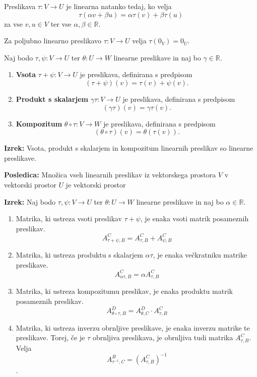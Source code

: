 \documentclass{article}
\begin{document}
\begin{multicols}{2}
Preslikava \( \tau: V \to U \) je linearna natanko tedaj, ko velja
\[ \tau(\alpha v + \beta u) = \alpha \tau(v) + \beta \tau(u) \]
za vse \( v, u \in V \) ter vse \( \alpha, \beta \in \mathbb{R} \).

Za poljubno linearno preslikavo \( \tau: V \to U \) velja \( \tau(0_V) = 0_U \).

Naj bodo \( \tau, \psi: V \to U \) ter \( \theta: U \to W \) linearne preslikave in naj bo \( \gamma \in \mathbb{R} \).
\begin{enumerate}
    \item[(1)] \textbf{Vsota} \( \tau + \psi: V \to U \) je preslikava, definirana s predpisom
    \[ (\tau + \psi)(v) = \tau(v) + \psi(v). \]
    \item[(2)] \textbf{Produkt s skalarjem} \( \gamma\tau: V \to U \) je preslikava, definirana s predpisom
    \[ (\gamma\tau)(v) = \gamma \tau(v). \]
    \item[(3)] \textbf{Kompozitum} \( \theta \circ \tau: V \to W \) je preslikava, definirana s predpisom
    \[ (\theta \circ \tau)(v) = \theta(\tau(v)). \]
\end{enumerate}

\textbf{Izrek:} Vsota, produkt s skalarjem in kompozitum linearnih preslikav so linearne preslikave.

\textbf{Posledica:} Množica vseh linearnih preslikav iz vektorskega prostora \( V \) v vektorski prostor \( U \) je vektorski prostor

\textbf{Izrek:} Naj bodo \( \tau, \psi: V \to U \) ter \( \theta: U \to W \) linearne preslikave in naj bo \( \alpha \in \mathbb{R} \).
\begin{enumerate}
    \item Matrika, ki ustreza vsoti preslikav \( \tau + \psi \), je enaka vsoti matrik posameznih preslikav.
    \[ A_{\tau+\psi,B}^C = A_{\tau,B}^C + A_{\psi,B}^C \]
    \item Matrika, ki ustreza produktu s skalarjem \( \alpha\tau \), je enaka večkratniku matrike preslikave.
    \[ A_{\alpha\tau,B}^C = \alpha A_{\tau,B}^C \]
    \item Matrika, ki ustreza kompozitumu preslikav, je enaka produktu matrik posameznih preslikav.
    \[ A_{\theta\circ\tau,B}^D = A_{\theta,C}^D \cdot A_{\tau,B}^C \]
    \item Matrika, ki ustreza inverzu obrnljive preslikave, je enaka inverzu matrike te preslikave. Torej, če je \( \tau \) obrnljiva preslikava, je obrnljiva tudi matrika \( A_{\tau,B}^C \). Velja
    \[ A_{\tau^{-1},C}^B = (A_{\tau,B}^C)^{-1} \].
\end{enumerate}



\end{multicols}
\end{document}
